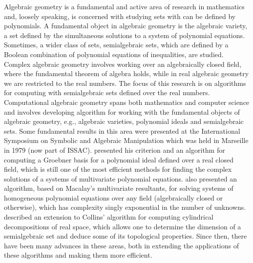\documentclass[
]{book}
\theoremstyle{definition}
\theoremstyle{definition}
\theoremstyle{definition}
\theoremstyle{definition}
\theoremstyle{remark}
\begin{document}
Algebraic geometry is a fundamental and active area of research in mathematics and, loosely speaking, is concerned with studying sets with can be defined by polynomials. A fundamental object in algebraic geometry is the algebraic variety, a set defined by the simultaneous solutions to a system of polynomial equations. Sometimes, a wider class of sets, semialgebraic sets, which are defined by a Boolean combination of polynomial equations of inequalities, are studied. Complex algebraic geometry involves working over an algebraically closed field, where the fundamental theorem of algebra holds, while in real algebraic geometry we are restricted to the real numbers. The focus of this research is on algorithms for computing with semialgebraic sets defined over the real numbers.
Computational algebraic geometry spans both mathematics and computer science and involves developing algorithm for working with the fundamental objects of algebraic geometry, e.g., algebraic varieties, polynomial ideals and semialgebraic sets.
Some fundamental results in this area were presented at the International Symposium on Symbolic and Algebraic Manipulation which was held in Marseille in 1979 (now part of ISSAC).
\citet{buchberger1979} presented his criterion and an algorithm for computing a Groebner basis for a polynomial ideal defined over a real closed field, which is still one of the most efficient methods for finding the complex solutions of a systems of multivariate polynomial equations.
\citet{lazard1979} also presented an algorithm, based on Macalay's multivariate resultants, for solving systems of homogeneous polynomial equations over any field (algebraically closed or otherwise), which has complexity singly exponential in the number of unknowns.
\citet{arnon1979} described an extension to Collins' algorithm for computing cylindrical decompositions of real space, which allows one to determine the dimension of a semialgebraic set and deduce some of its topological properties.
Since then, there have been many advances in these areas, both in extending the applications of these algorithms and making them more efficient.
\end{document}
